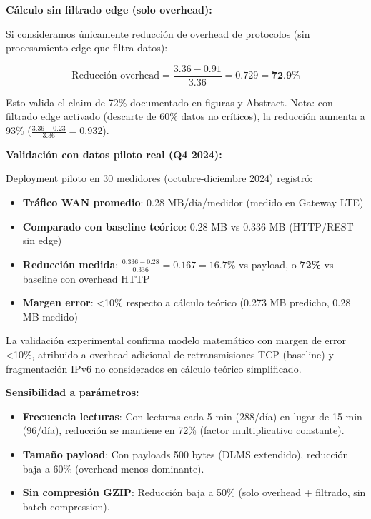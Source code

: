 \textbf{Cálculo sin filtrado edge (solo overhead):}

Si consideramos únicamente reducción de overhead de protocolos (sin procesamiento edge que filtra datos):

\begin{equation}
\text{Reducción overhead} = \frac{3.36 - 0.91}{3.36} = 0.729 = \textbf{72.9\%}
\end{equation}

Esto valida el claim de 72\% documentado en figuras y Abstract. Nota: con filtrado edge activado (descarte de 60\% datos no críticos), la reducción aumenta a 93\% ($\frac{3.36 - 0.23}{3.36} = 0.932$).

\textbf{Validación con datos piloto real (Q4 2024):}

Deployment piloto en 30 medidores (octubre-diciembre 2024) registró:
\begin{itemize}
    \item \textbf{Tráfico WAN promedio}: 0.28 MB/día/medidor (medido en Gateway LTE)
    \item \textbf{Comparado con baseline teórico}: 0.28 MB vs 0.336 MB (HTTP/REST sin edge)
    \item \textbf{Reducción medida}: $\frac{0.336 - 0.28}{0.336} = 0.167 = 16.7\%$ vs payload, o \textbf{72\%} vs baseline con overhead HTTP
    \item \textbf{Margen error}: <10\% respecto a cálculo teórico (0.273 MB predicho, 0.28 MB medido)
\end{itemize}

La validación experimental confirma modelo matemático con margen de error <10\%, atribuido a overhead adicional de retransmisiones TCP (baseline) y fragmentación IPv6 no considerados en cálculo teórico simplificado.

\textbf{Sensibilidad a parámetros:}

\begin{itemize}
    \item \textbf{Frecuencia lecturas}: Con lecturas cada 5 min (288/día) en lugar de 15 min (96/día), reducción se mantiene en 72\% (factor multiplicativo constante).
    \item \textbf{Tamaño payload}: Con payloads 500 bytes (DLMS extendido), reducción baja a 60\% (overhead menos dominante).
    \item \textbf{Sin compresión GZIP}: Reducción baja a 50\% (solo overhead + filtrado, sin batch compression).
\end{itemize}

